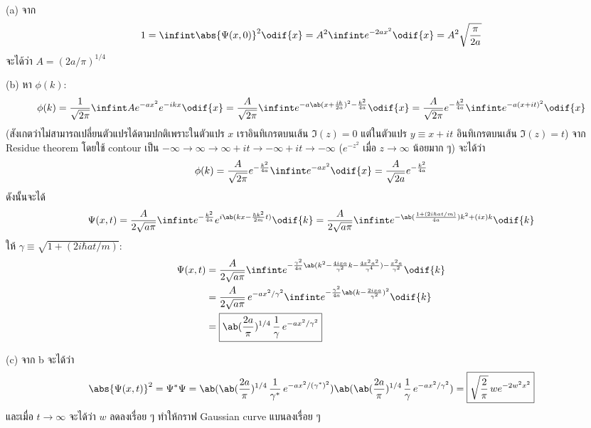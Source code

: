 \begin{soln}
    (a) จาก
    \[
        1 = \infint \abs{\Psi(x, 0)}^2 \odif{x} = A^2 \infint e^{-2ax^2}\odif{x} = A^2 \sqrt{\frac{\pi}{2a}}
    \]
    จะได้ว่า $\boxed{A = (2a/\pi)^{1/4}}$
    
    (b) หา $\phi(k)$:
    \[
        \phi(k) = \frac{1}{\sqrt{2\pi}} \infint Ae^{-ax^2}e^{-ikx}\odif{x} = \frac{A}{\sqrt{2\pi}} \infint e^{-a\ab(x + \frac{ik}{2a})^2 - \frac{k^2}{4a}} \odif{x} = \frac{A}{\sqrt{2\pi}} e^{-\frac{k^2}{4a}} \infint e^{-a(x + it)^2} \odif{x}
    \]
    (สังเกตว่าไม่สามารถเปลี่ยนตัวแปรได้ตามปกติเพราะในตัวแปร $x$ เราอินทิเกรตบนเส้น $\Im(z) = 0$ แต่ในตัวแปร $y \equiv x + it$ อินทิเกรตบนเส้น $\Im(z) = t$) จาก Residue theorem โดยใช้ contour เป็น $-\infty \to \infty \to \infty + it \to -\infty + it \to -\infty$ ($e^{-z^2}$ เมื่อ $z\to\infty$ น้อยมาก ๆ) จะได้ว่า
    \[
        \phi(k) = \frac{A}{\sqrt{2\pi}} e^{-\frac{k^2}{4a}} \infint e^{-ax^2}\odif{x} = \frac{A}{\sqrt{2a}} e^{-\frac{k^2}{4a}}
    \]
    ดังนั้นจะได้
    \[
        \Psi(x, t) = \frac{A}{2\sqrt{a\pi}} \infint e^{-\frac{k^2}{4a}} e^{i\ab(kx - \frac{\hbar k^2}{2m}t)} \odif{k} = \frac{A}{2\sqrt{a\pi}} \infint e^{-\ab(\frac{1 + (2i\hbar at/m)}{4a})k^2 + (ix)k} \odif{k}
    \]
    ให้ $\gamma \equiv \sqrt{1 + (2i\hbar at/m)}$:
    \begin{align*}
        \Psi(x, t) &= \frac{A}{2\sqrt{a\pi}} \infint e^{-\frac{\gamma^2}{4a}\ab(k^2 - \frac{4ixa}{\gamma^2}k - \frac{4x^2a^2}{\gamma^4}) - \frac{x^2a}{\gamma^2}} \odif{k} \\
        &= \frac{A}{2\sqrt{a\pi}}\,e^{-ax^2/\gamma^2} \infint e^{-\frac{\gamma^2}{4a}\ab(k-\frac{2ixa}{\gamma^2})^2} \odif{k} \\
        &= \boxed{\ab(\frac{2a}{\pi})^{1/4}\,\frac{1}{\gamma}\,e^{-ax^2/\gamma^2}}
    \end{align*}

    (c) จาก b จะได้ว่า
    \[
        \abs{\Psi(x, t)}^2 = \Psi^*\Psi = \ab(\ab(\frac{2a}{\pi})^{1/4}\,\frac{1}{\gamma^*}\,e^{-ax^2/(\gamma^*)^2})\ab(\ab(\frac{2a}{\pi})^{1/4}\,\frac{1}{\gamma}\,e^{-ax^2/\gamma^2}) = \boxed{\sqrt{\frac{2}{\pi}}\,we^{-2w^2x^2}}
    \]
    และเมื่อ $t\to\infty$ จะได้ว่า $w$ ลดลงเรื่อย ๆ ทำให้กราฟ Gaussian curve แบนลงเรื่อย ๆ


\end{soln}
